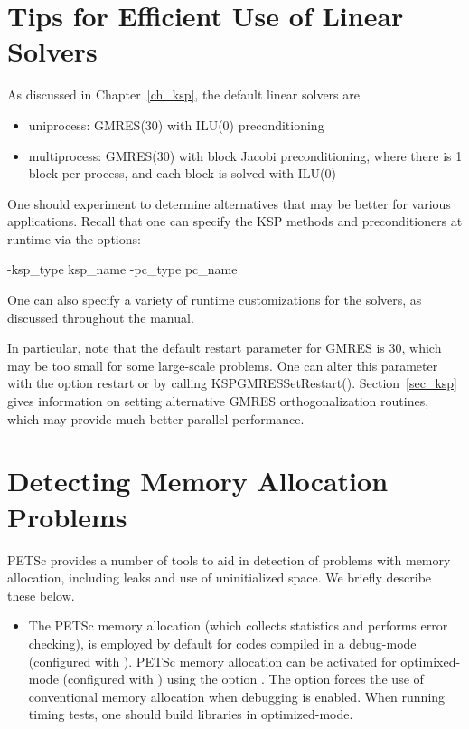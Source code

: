 {{\section{Tips for Efficient Use of Linear Solvers}
\label{sec_slestips}

As discussed in Chapter~\ref{ch_ksp}, the default linear solvers are
\begin{itemize}
\item uniprocess: GMRES(30) with ILU(0) preconditioning\\
\item multiprocess: GMRES(30) with block Jacobi preconditioning, where there
                     is 1 block per process, and each block is solved with ILU(0)\\
\end{itemize}
One should experiment to determine alternatives that may be better for
various applications.  Recall that one can specify the KSP methods and
preconditioners at runtime via the options:
\begin{tabbing}
   -ksp\_type \trl{<}ksp\_name\trl{>} -pc\_type \trl{<}pc\_name\trl{>}
\end{tabbing}
One can also specify a variety of runtime customizations for the
solvers, as discussed throughout the manual.

In particular, note that the default restart parameter for GMRES is
30, which may be too small for some large-scale problems.  One can alter this
parameter with the option  \trl{<}restart\trl{>} or by
calling KSPGMRESSetRestart(). Section~\ref{sec_ksp} gives
information on setting alternative GMRES orthogonalization routines,
which may provide much better parallel performance.

\section{Detecting Memory Allocation Problems}

PETSc provides a number of tools to aid in detection of problems
with memory allocation, including leaks and use of uninitialized space.
We briefly describe these below.
 

\begin{itemize}

\item The PETSc memory allocation (which collects statistics and
performs error checking), is employed by default for codes compiled in
a debug-mode (configured with ).  PETSc memory
allocation can be activated for optimixed-mode (configured with
) using the option . The option
 forces the use of conventional memory allocation when
debugging is enabled.  When running timing tests, one should build
libraries in optimized-mode.


\end{itemize}}}
